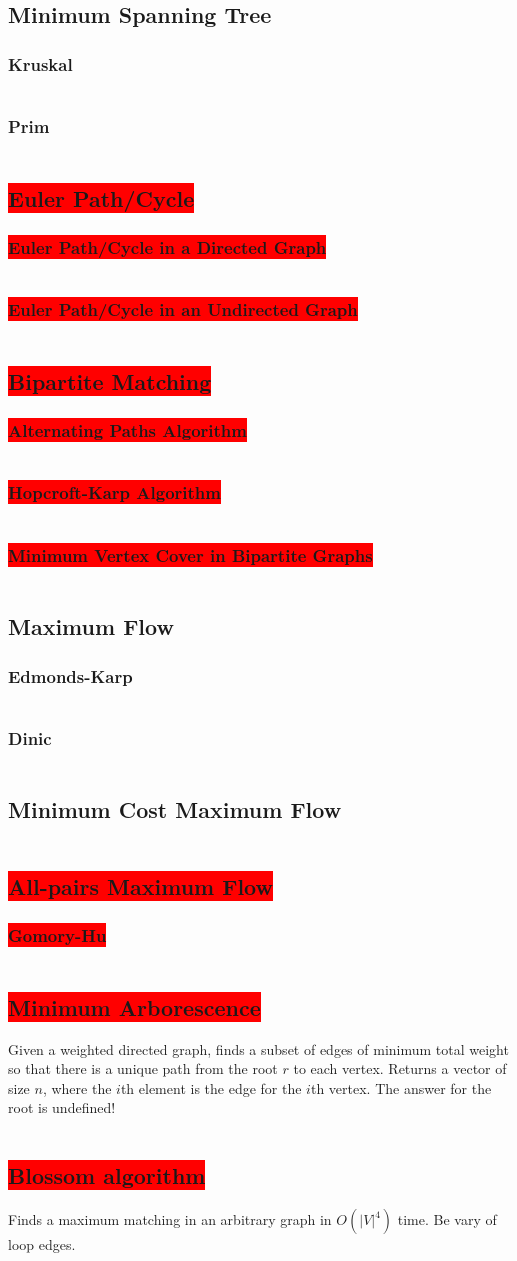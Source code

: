 \documentclass[8pt,a4paper,landscape,oneside]{amsart}
\newcommand{\code}[1]{\inputminted[fontsize=\normalsize,baselinestretch=1]{cpp}{_code/#1}}
\newcommand{\subsectionRed}[1]{\subsection{\colorbox{red}{\color{white}#1}}}
\newcommand{\subsubsectionRed}[1]{\subsubsection{\colorbox{red}{\color{white}#1}}}
\begin{document}
\begin{multicols*}{3}
	\subsection{Minimum Spanning Tree}
		\subsubsection{Kruskal}
      \code{graphs/mst/kruskal.cpp}
		\subsubsection{Prim}
      \code{graphs/mst/prim.cpp}
	\subsectionRed{Euler Path/Cycle}
    \subsubsectionRed{Euler Path/Cycle in a Directed Graph}
      \code{graphs/euler_path.cpp}
    \subsubsectionRed{Euler Path/Cycle in an Undirected Graph}
      \code{graphs/euler_path_undirected.cpp}
	\subsectionRed{Bipartite Matching}
		\subsubsectionRed{Alternating Paths Algorithm}
      \code{graphs/bipartite_matching/bipartite_matching.cpp}
		\subsubsectionRed{Hopcroft-Karp Algorithm}
      \code{graphs/bipartite_matching/hopcroft_karp.cpp}
    \subsubsectionRed{Minimum Vertex Cover in Bipartite Graphs}
      \code{graphs/bipartite_matching/bipartite_mvc.cpp}
	\subsection{Maximum Flow}
		\subsubsection{Edmonds-Karp}
			\code{graphs/max_flow/edmonds_karp.cpp}
		\subsubsection{Dinic}
			\code{graphs/max_flow/dinic.cpp}
  \subsection{Minimum Cost Maximum Flow}
    \code{graphs/max_flow/mcst.cpp}
  \subsectionRed{All-pairs Maximum Flow}
    \subsubsectionRed{Gomory-Hu}
      \code{graphs/max_flow/gomory_hu_tree.cpp}
  \subsectionRed{Minimum Arborescence}
    Given a weighted directed graph, finds a subset of edges of minimum
    total weight so that there is a unique path from the root $r$ to each
    vertex. Returns a vector of size $n$, where the $i$th element is the
    edge for the $i$th vertex. The answer for the root is undefined!
    \code{graphs/arborescence.cpp}
  \subsectionRed{Blossom algorithm}
    Finds a maximum matching in an arbitrary graph in $O(|V|^4)$ time. Be
    vary of loop edges.
    \code{graphs/blossom.cpp}

\end{multicols*}
\end{document}
